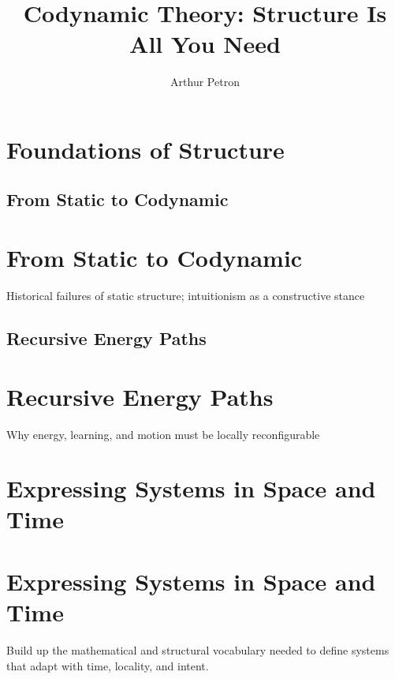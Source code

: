 \documentclass[11pt]{article}
\title{Codynamic Theory: Structure Is All You Need}
\author{Arthur Petron}
\begin{document}
\maketitle

\section{Foundations of Structure}

\subsection{From Static to Codynamic}

\section{From Static to Codynamic}

Historical failures of static structure; intuitionism as a constructive stance


\subsection{Recursive Energy Paths}

\section{Recursive Energy Paths}

Why energy, learning, and motion must be locally reconfigurable


\section{Expressing Systems in Space and Time}

\section{Expressing Systems in Space and Time}

Build up the mathematical and structural vocabulary needed to define systems that adapt with time, locality, and intent.
\end{document}
